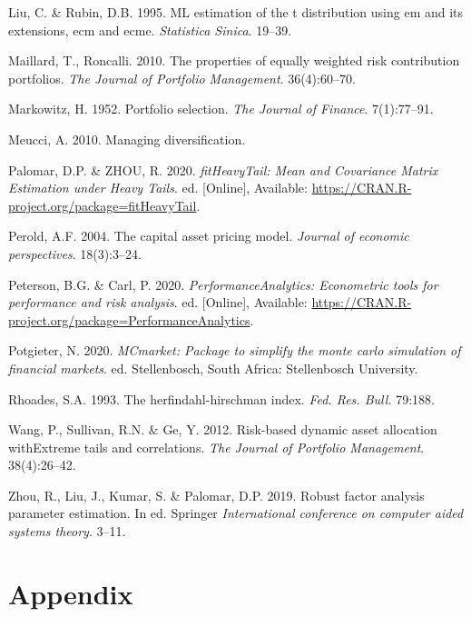\documentclass[11pt,preprint, authoryear]{elsarticle}
\numberwithin{equation}{section}
\numberwithin{figure}{section}
\numberwithin{table}{section}
\begin{document}
\leavevmode\hypertarget{ref-liu1995}{}%
Liu, C. \& Rubin, D.B. 1995. ML estimation of the t distribution using
em and its extensions, ecm and ecme. \emph{Statistica Sinica}. 19--39.

\leavevmode\hypertarget{ref-maillard2010}{}%
Maillard, T., Roncalli. 2010. The properties of equally weighted risk
contribution portfolios. \emph{The Journal of Portfolio Management}.
36(4):60--70.

\leavevmode\hypertarget{ref-markowitz}{}%
Markowitz, H. 1952. Portfolio selection. \emph{The Journal of Finance}.
7(1):77--91.

\leavevmode\hypertarget{ref-meucci2010}{}%
Meucci, A. 2010. Managing diversification.

\leavevmode\hypertarget{ref-fitHeavyTail}{}%
Palomar, D.P. \& ZHOU, R. 2020. \emph{fitHeavyTail: Mean and Covariance
Matrix Estimation under Heavy Tails}. ed. {[}Online{]}, Available:
\url{https://CRAN.R-project.org/package=fitHeavyTail}.

\leavevmode\hypertarget{ref-perold2004}{}%
Perold, A.F. 2004. The capital asset pricing model. \emph{Journal of
economic perspectives}. 18(3):3--24.

\leavevmode\hypertarget{ref-PerformanceAnalytics}{}%
Peterson, B.G. \& Carl, P. 2020. \emph{PerformanceAnalytics: Econometric
tools for performance and risk analysis}. ed. {[}Online{]}, Available:
\url{https://CRAN.R-project.org/package=PerformanceAnalytics}.

\leavevmode\hypertarget{ref-MCmarket}{}%
Potgieter, N. 2020. \emph{MCmarket: Package to simplify the monte carlo
simulation of financial markets}. ed. Stellenbosch, South Africa:
Stellenbosch University.

\leavevmode\hypertarget{ref-rhoades1993}{}%
Rhoades, S.A. 1993. The herfindahl-hirschman index. \emph{Fed. Res.
Bull.} 79:188.

\leavevmode\hypertarget{ref-wang2012}{}%
Wang, P., Sullivan, R.N. \& Ge, Y. 2012. Risk-based dynamic asset
allocation withExtreme tails and correlations. \emph{The Journal of
Portfolio Management}. 38(4):26--42.

\leavevmode\hypertarget{ref-zhou2019}{}%
Zhou, R., Liu, J., Kumar, S. \& Palomar, D.P. 2019. Robust factor
analysis parameter estimation. In ed. Springer \emph{International
conference on computer aided systems theory}. 3--11.

\newpage

\hypertarget{appendix}{%
\section*{Appendix}\label{appendix}}
\end{document}
